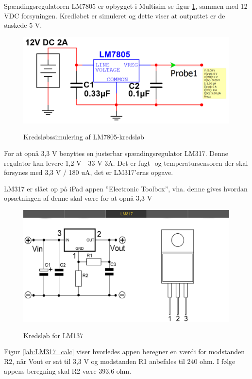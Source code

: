 Spændingsregulatoren LM7805 er opbygget i Multisim se figur \ref{lab:LM7805_SIMULERING}, sammen med 12 VDC forsyningen. Kredløbet er simuleret og dette viser at outputtet er de ønskede 5 V.

\begin{figure}[H] \centering
{\includegraphics[width=\textwidth]{filer/design/Billeder/LM7805_SIMULATION}}
\caption{Kredsløbssimulering af LM7805-kredsløb}
\label{lab:LM7805_SIMULERING}
\raggedright
\end{figure}


For at opnå 3,3 V benyttes en justerbar spændingsregulator LM317. Denne regulator kan levere 1,2 V - 33 V 3A. Det er fugt- og temperatursensoren der skal forsynes med 3,3 V / 180 uA, det er LM317'erns opgave. 

LM317 er slået op på iPad appen ''Electronic Toolbox'', vha. denne gives hvordan opsætningen af denne skal være for at opnå 3,3 V 
 
\begin{figure}[H] \centering
{\includegraphics[width=\textwidth]{filer/design/Billeder/LM317}}
\caption{Kredsløb for LM137}
\label{lab:LM317}
\raggedright
\end{figure}

Figur \ref{lab:LM317_calc} viser hvorledes appen beregner en værdi for modstanden R2, når Vout er sat til 3,3 V og modstanden R1 anbefales til 240 ohm. I følge appens beregning skal R2 være 393,6 ohm.

